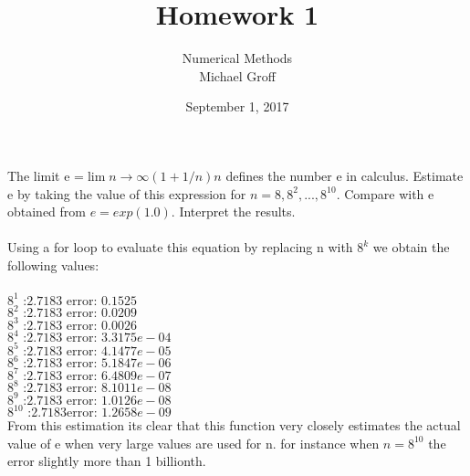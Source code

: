 \documentclass[12pt]{article}
\newenvironment{problem}[2][Problem]{\begin{trivlist}
\item[\hskip \labelsep {\bfseries #1}\hskip \labelsep {\bfseries #2.}]}{\end{trivlist}}
\begin{document}
\title{Homework 1}
\author{Numerical Methods\\ Michael Groff\\ 
}
\date{September 1, 2017}
\maketitle

\begin{problem}{4}
 The limit e =$\lim n\to \infty (1+1/n) n$ deﬁnes the number e in calculus. Estimate e by taking the value of this expression for $n = 8,8^2,...,8^{10}$. Compare with e obtained from $e = exp(1.0)$. Interpret the results. \\
 \text{ }\\
 Using a for loop to evaluate this equation by replacing n with $8^k$ we obtain the following values:\\
  \text{ }\\
$8^1 \text{ :} 2.7183 \text{ error: } 0.1525$ \\
$ 8^2 \text{ :}   2.7183 \text{ error: } 0.0209$\\
$8^3 \text{ :}    2.7183\text{ error: }  0.0026$\\
$8^4 \text{ :}    2.7183\text{ error: }    3.3175e-04$\\
$8^5 \text{ :}    2.7183\text{ error: }  4.1477e-05$\\
$8^6 \text{ :}    2.7183\text{ error: }    5.1847e-06$\\
$8^7 \text{ :}    2.7183\text{ error: }  6.4809e-07$\\
$8^8 \text{ :}    2.7183\text{ error: }   8.1011e-08$\\
$8^9 \text{ :}    2.7183\text{ error: }   1.0126e-08$\\
$8^{10} \text{ :}    2.7183\text{error: }    1.2658e-09$\\
 
 

 
 
 From this estimation its clear that this function very closely estimates the actual value of e when very large values are used for n. for instance when $n = 8^{10}$ the error slightly more than 1 billionth.

\end{problem}
\end{document}
